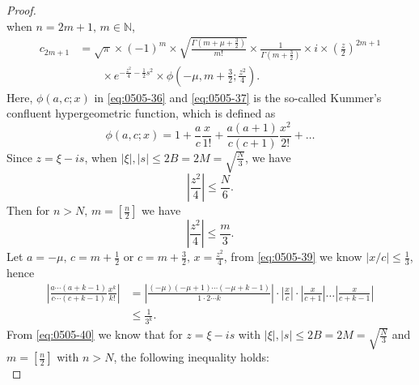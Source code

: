 \documentclass[pdflatex,sn-aps]{sn-jnl}%
\theoremstyle{thmstyleone}%
\theoremstyle{thmstyletwo}%
\theoremstyle{thmstylethree}%
\begin{document}
\begin{proof}
\begin{equation}
  \end{equation}
  when $n = 2m+1,\, m \in \mathbb{N}$,
  \begin{equation}\label{eq:0505-37}
    \begin{aligned}
    c_{2 m+1} & =\sqrt{\pi} \times(-1)^m \times \sqrt{\frac{\Gamma\left(m+\mu+\frac{3}{2}\right)}{m!}} \times \frac{1}{\Gamma\left(m+\frac{3}{2}\right)} \times i \times\left(\frac{z}{2}\right)^{2 m+1} \\
    &{}\qquad \times e^{-\frac{z^2}{4}-\frac{1}{2} s^2} \times \phi\left(-\mu, m+\frac{3}{2} ; \frac{z^2}{4}\right).
    \end{aligned}
  \end{equation}
  Here, $\phi\left(a,c;x\right)$ in \eqref{eq:0505-36} and \eqref{eq:0505-37} is the so-called
  Kummer's confluent hypergeometric function, which is defined as
  \begin{equation}\label{eq:0505-38}
    \phi(a, c ; x)=1+\frac{a}{c} \frac{x}{1!}+\frac{a(a+1)}{c(c+1)} \frac{x^2}{2!}+\ldots
  \end{equation}
  Since $z = \xi - is$, when $|\xi|,|s| \leqslant 2 B=2 M=\sqrt{\frac{N}{3}}$, we have
  \begin{displaymath}
    \left|\frac{z^2}{4}\right| \leqslant \frac{N}{6}.
  \end{displaymath}
  Then for $n > N,\, m=\left[\frac{n}{2}\right]$ we have
  \begin{equation}\label{eq:0505-39}
    \left|\frac{z^2}{4}\right| \leqslant \frac{m}{3}.
  \end{equation}
  Let $a = -\mu,\,c = m+\frac{1}{2}$ or $c = m+\frac{3}{2},\,x=\frac{z^2}{4}$,
  from \eqref{eq:0505-39} we know $|x / c| \leqslant \frac{1}{3}$, hence
  \begin{equation}\label{eq:0505-40}
    \begin{aligned}
    \left|\frac{a \cdots(a+k-1)}{c \cdots(c+k-1)} \frac{x^k}{k!}\right| 
    & =  \left|\frac{(-\mu) (-\mu+1) \cdots (-\mu+k-1)}{1 \cdot 2  \cdots  k}\right| \cdot\left|\frac{x}{c}\right| \cdot\left|\frac{x}{c+1}\right|  \ldots \left|\frac{x}{c+k-1}\right| \\
    & \leqslant  \frac{1}{3^k}.
    \end{aligned}
  \end{equation}
  From \eqref{eq:0505-40} we know that for $z=\xi-i s$ with $|\xi|,|s| \leqslant 2 B=2 M=\sqrt{\frac{N}{3}}$
  and $m=\left[\frac{n}{2}\right]$ with $n>N$, the following inequality holds:
  \begin{equation}\label{eq:0505-41}

\end{equation}
\end{proof}
\end{document}
